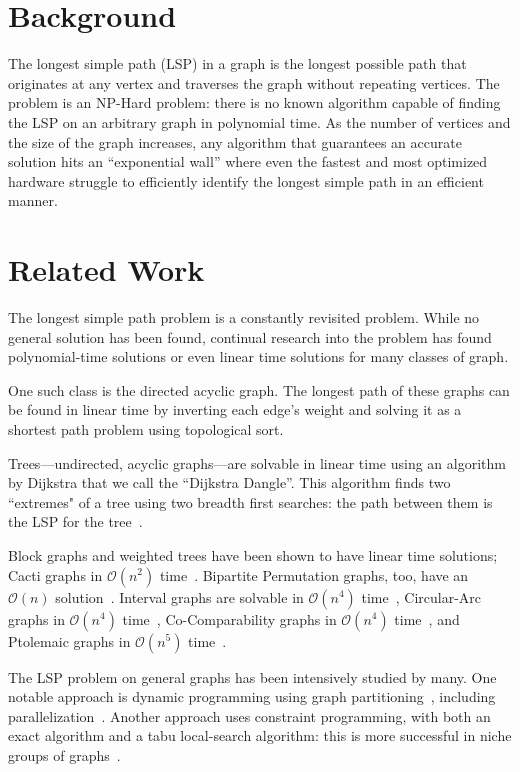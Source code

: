\documentclass[twocolumn,showpacs,%
  nofootinbib,aps,superscriptaddress,%
  eqsecnum,prd,notitlepage,showkeys,11pt]{article}
\begin{document}
\section{Background}

The longest simple path (LSP) in a graph is the longest possible path that originates at any vertex and traverses the graph without repeating vertices. The problem is an NP-Hard problem: there is no known algorithm capable of finding the LSP on an arbitrary graph in polynomial time. As the number of vertices and the size of the graph increases, any algorithm that guarantees an accurate solution hits an ``exponential wall'' where even the fastest and most optimized hardware struggle to efficiently identify the longest simple path in an efficient manner.

\section{Related Work} 
The longest simple path problem is a constantly revisited problem. While no general solution has been found, continual research into the problem has found polynomial-time solutions or even linear time solutions for many classes of graph.

One such class is the directed acyclic graph. The longest path of these graphs can be found in linear time by inverting each edge's weight and solving it as a shortest path problem using topological sort.~\cite{sedgewick_wayne_2017}

Trees---undirected, acyclic graphs---are solvable in linear time using an algorithm by Dijkstra that we call the ``Dijkstra Dangle''. This algorithm finds two ``extremes" of a tree using two breadth first searches: the path between them is the LSP for the tree~\cite{club2002computing}.

Block graphs and weighted trees have been shown to have linear time solutions; Cacti graphs in $\mathcal{O}(n^2)$ time~\cite{uehara2004efficient, uehara2007computing}. Bipartite Permutation graphs, too, have an $\mathcal{O}(n)$ solution~\cite{uehara2007linear}. Interval graphs are solvable in $\mathcal{O}(n^4)$ time~\cite{ioannidou2009longest,  giannopoulou2015polynomial}, Circular-Arc graphs in $\mathcal{O}(n^4)$ time~\cite{mertzios2011computing}, Co-Comparability graphs in $\mathcal{O}(n^4)$ time~\cite{mertzios2012simple}, and Ptolemaic graphs in $\mathcal{O}(n^5)$ time~\cite{takahara2008longest}.

The LSP problem on general graphs has been intensively studied by many. One notable approach is dynamic programming using graph partitioning~\cite{balyo2017optimal}, including parallelization~\cite{fieger2019finding}. Another approach uses constraint programming, with both an exact algorithm and a tabu local-search algorithm: this is more successful in niche groups of graphs~\cite{pham2012solving}.
\end{document}
